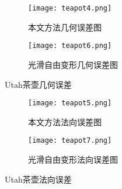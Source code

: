 \begin{figure}[htbp]
	\centering
	\begin{subfigure}[b]{.45\textwidth}
		\centering
		\texttt{[image: teapot4.png]}
		\caption{本文方法几何误差图}\label{subfig:teapot4}
	\end{subfigure}%
	\begin{subfigure}[b]{.45\textwidth}
		\centering
		\texttt{[image: teapot6.png]}
		\caption{光滑自由变形几何误差图}\label{subfig:teapot6}
	\end{subfigure}
	\caption{Utah茶壶几何误差}\label{fig:teapot_error0}
\end{figure}
\begin{figure}[htbp]
	\centering
	\begin{subfigure}[b]{.45\textwidth}
		\centering
		\texttt{[image: teapot5.png]}
		\caption{本文方法法向误差图}\label{subfig:teapot5}
	\end{subfigure}%
	\begin{subfigure}[b]{.45\textwidth}
		\centering
		\texttt{[image: teapot7.png]}
		\caption{光滑自由变形法向误差图}\label{subfig:teapot7}
	\end{subfigure}
	\caption{Utah茶壶法向误差}\label{fig:teapot_error1}
\end{figure}
